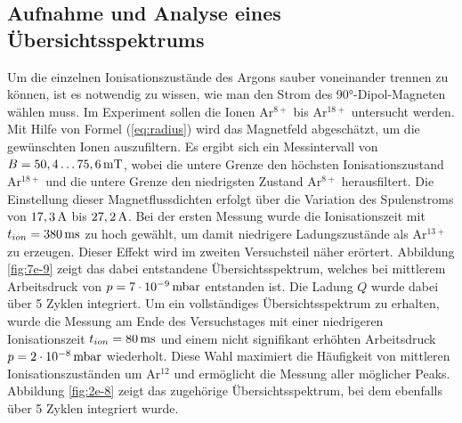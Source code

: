 	\subsection{Aufnahme und Analyse eines Übersichtsspektrums}
		Um die einzelnen Ionisationszustände des Argons sauber voneinander trennen zu können, ist es notwendig zu wissen, wie man den Strom des 90°-Dipol-Magneten wählen muss. Im Experiment sollen die Ionen Ar$^{8+}$ bis Ar$^{18+}$ untersucht werden. Mit Hilfe von Formel (\ref{eq:radius}) wird das Magnetfeld abgeschätzt, um die gewünschten Ionen auszufiltern. Es ergibt sich ein Messintervall von $B = 50,4 \dots \unit[75,6]{mT}$, wobei die untere Grenze den höchsten Ionisationszustand Ar$^{18+}$ und die untere Grenze den niedrigsten Zustand Ar$^{8+}$ herausfiltert. Die Einstellung dieser Magnetflussdichten erfolgt über die Variation des Spulenstroms von $\unit[17,3]{A}$ bis $\unit[27,2]{A}$. 
		Bei der ersten Messung wurde die Ionisationszeit mit $t_{ion} = \unit[380]{ms}$ zu hoch gewählt, um damit niedrigere Ladungszustände als Ar$^{13+}$ zu erzeugen. Dieser Effekt wird im zweiten Versuchsteil näher erörtert. Abbildung \ref{fig:7e-9} zeigt das dabei entstandene Übersichtsspektrum, welches bei mittlerem Arbeitsdruck von $p = \unit[7\cdot 10^{-9}]{mbar}$ entstanden ist. Die Ladung $Q$ wurde dabei über 5 Zyklen integriert.		
		Um ein vollständiges Übersichtsspektrum zu erhalten, wurde die Messung am Ende des Versuchstages mit einer niedrigeren Ionisationszeit $t_{ion} = \unit[80]{ms}$ und einem nicht signifikant erhöhten Arbeitsdruck $p = \unit[2\cdot 10^{-8}]{mbar}$ wiederholt. Diese Wahl maximiert die Häufigkeit von mittleren Ionisationszuständen um Ar$^{12}$ und ermöglicht die Messung aller möglicher Peaks. Abbildung \ref{fig:2e-8} zeigt das zugehörige Übersichtsspektrum, bei dem ebenfalls über 5 Zyklen integriert wurde.\\
